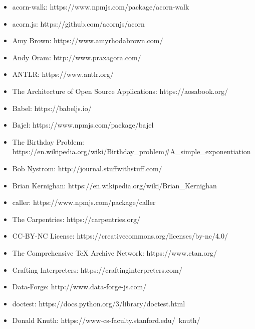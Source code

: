 \documentclass[krantzl]{krantz}
\begin{document}
\begin{itemize}

\item acorn-walk: https://www.npmjs.com/package/acorn-walk

\item acorn.js: https://github.com/acornjs/acorn

\item Amy Brown: https://www.amyrhodabrown.com/

\item Andy Oram: http://www.praxagora.com/

\item ANTLR: https://www.antlr.org/

\item The Architecture of Open Source Applications: https://aosabook.org/

\item Babel: https://babeljs.io/

\item Bajel: https://www.npmjs.com/package/bajel

\item The Birthday Problem: https://en.wikipedia.org/wiki/Birthday\_problem\#A\_simple\_exponentiation

\item Bob Nystrom: http://journal.stuffwithstuff.com/

\item Brian Kernighan: https://en.wikipedia.org/wiki/Brian\_Kernighan

\item caller: https://www.npmjs.com/package/caller

\item The Carpentries: https://carpentries.org/

\item CC-BY-NC License: https://creativecommons.org/licenses/by-nc/4.0/

\item The Comprehensive TeX Archive Network: https://www.ctan.org/

\item Crafting Interpreters: https://craftinginterpreters.com/

\item Data-Forge: http://www.data-forge-js.com/

\item doctest: https://docs.python.org/3/library/doctest.html

\item Donald Knuth: https://www-cs-faculty.stanford.edu/~knuth/


\end{itemize}
\end{document}
